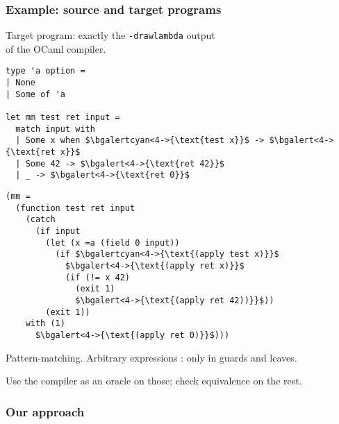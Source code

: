 \documentclass[dvipsnames]{beamer}
\begin{document}
\begin{frame}[fragile]
  \frametitle{Example: source and target programs}
  Target program: exactly the \texttt{-drawlambda} output \\ of the OCaml compiler.


\vfill

\begin{small}
  \hspace{-1em}
  \begin{minipage}{0.36\linewidth}
\begin{lstlisting}
type 'a option =
| None
| Some of 'a

let mm test ret input =
  match input with
  | Some x when $\bgalertcyan<4->{\text{test x}}$ -> $\bgalert<4->{\text{ret x}}$
  | Some 42 -> $\bgalert<4->{\text{ret 42}}$
  | _ -> $\bgalert<4->{\text{ret 0}}$
\end{lstlisting}
  \end{minipage}
  \hfill\pause
  \begin{minipage}{0.64\linewidth}
    \begin{lstlisting}
(mm =
  (function test ret input
    (catch
      (if input
        (let (x =a (field 0 input))
          (if $\bgalertcyan<4->{\text{(apply test x)}}$
            $\bgalert<4->{\text{(apply ret x)}}$
            (if (!= x 42)
              (exit 1)
              $\bgalert<4->{\text{(apply ret 42))}}$))
        (exit 1))
    with (1)
      $\bgalert<4->{\text{(apply ret 0)}}$)))
\end{lstlisting}
  \end{minipage}
\end{small}

\pause\vfill
Pattern-matching. Arbitrary expressions : \pause only in guards and leaves.

\pause\vfill

Use the compiler as an oracle on those;
check equivalence on the rest.
\end{frame}

\begin{frame}[fragile]
\frametitle{Our approach}

\vfill
\begin{center}
\end{center}
\vfill

\end{frame}
\end{document}
